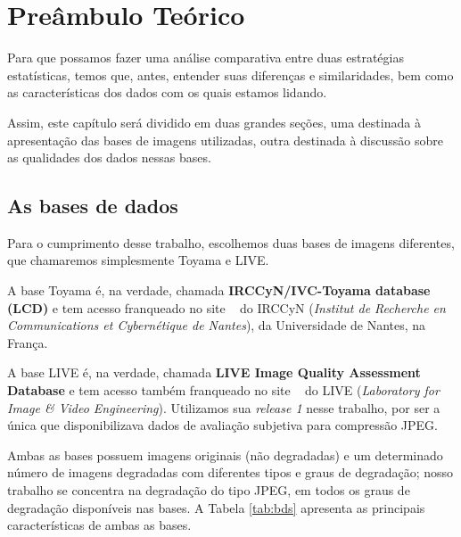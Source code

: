 \chapter{Preâmbulo Teórico}

Para que possamos fazer uma análise comparativa entre duas estratégias estatísticas, temos que, antes, entender suas diferenças e similaridades, bem como as características dos dados com os quais estamos lidando.

Assim, este capítulo será dividido em duas grandes seções, uma destinada à apresentação das bases de imagens utilizadas, outra destinada à discussão sobre as qualidades dos dados nessas bases.

\section{As bases de dados}\label{sec:imdb}

Para o cumprimento desse trabalho, escolhemos duas bases de imagens diferentes, que chamaremos simplesmente Toyama e LIVE.

A base Toyama é, na verdade, chamada \textbf{IRCCyN/IVC-Toyama database (LCD)} e tem acesso franqueado no site ~\cite{Tourancheau2008} do IRCCyN (\emph{Institut de Recherche en Communications et Cybernétique de Nantes}), da Universidade de Nantes, na França.

A base LIVE é, na verdade, chamada \textbf{LIVE Image Quality Assessment Database} e tem acesso também franqueado no site ~\cite{livedb} do LIVE (\emph{Laboratory for Image \& Video Engineering}). Utilizamos sua \emph{release 1} nesse trabalho, por ser a única que disponibilizava dados de avaliação subjetiva para compressão JPEG.

Ambas as bases possuem imagens originais (não degradadas) e um determinado número de imagens degradadas com diferentes tipos e graus de degradação; nosso trabalho se concentra na degradação do tipo JPEG, em todos os graus de degradação disponíveis nas bases. A Tabela \ref{tab:bds} apresenta as principais características de ambas as bases. 

